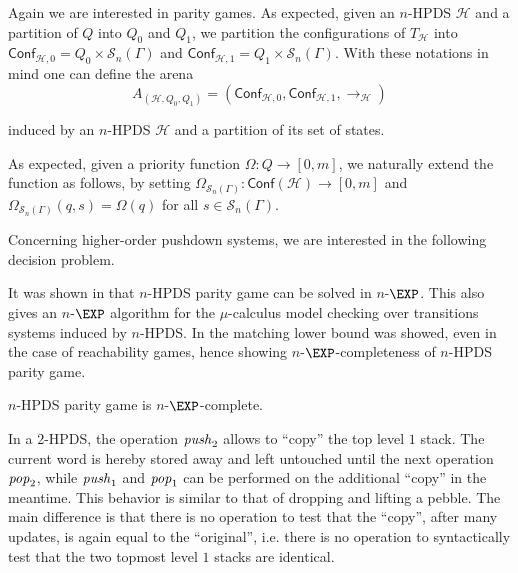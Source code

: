 \documentclass[a4paper,UKenglish,cleveref, autoref, thm-restate]{lipics-v2021}
\newcommand{\problemx}[3]{
	\vspace{0.2cm}
\par\noindent\underline{\sc#1}\par\nobreak\vskip.2\baselineskip
\begingroup\clubpenalty10000\widowpenalty10000
\setbox0\hbox{\bf INPUT:\ }\setbox1\hbox{\bf QUESTION:\ }
\dimen0=\wd0\ifnum\wd1>\dimen0\dimen0=\wd1\fi
\vskip-\parskip\noindent
\hbox to\dimen0{\box0\hfil}\hangindent\dimen0\hangafter1\ignorespaces#2\par
\vskip-\parskip\noindent
\hbox to\dimen0{\box1\hfil}\hangindent\dimen0\hangafter1\ignorespaces#3\par
\endgroup
	\vspace{-0.2cm}
}
\renewcommand{\H}{\mathcal{H}}
\newcommand{\Conf}{\mathsf{Conf}}
\newcommand{\win}{\textsc{Win}}
\begin{document}
Again we are interested in parity games.
As expected, given an 
 $n$-HPDS $\mathcal{H}$
 and a partition of
$Q$ into $Q_0$ and $Q_1$,
we partition the configurations of
$T_{\mathcal{H}}$
into
$\Conf_{\mathcal{H},0}=Q_0\times \mathscr{S}_n(\Gamma)$
and
$\Conf_{\mathcal{H},1}=Q_1\times\mathscr{S}_n(\Gamma)$.
%
%
With these notations in mind one can define the arena
$$
A_{(\mathcal{H}, Q_0, Q_1)}
=
(\Conf_{\mathcal{H},0}, \Conf_{\mathcal{H},1}, \rightarrow_{\mathcal{H}})$$
\par\noindent\ignorespacesafterend
induced by an $n$-HPDS $\mathcal{H}$ and a partition of its set of states.


As expected, given a 
priority function $\Omega: Q \to [0, m]$,
we naturally extend the function
as follows,
by setting
$\Omega_{\mathscr{S}_n(\Gamma)}: \Conf(\mathcal{H}) \to [0, m]$
and
$\Omega_{\mathscr{S}_n(\Gamma)}(q, s) = \Omega(q)$
for all
$s \in \mathscr{S}_n(\Gamma)$.





Concerning higher-order pushdown systems, we are interested in the following decision problem. 


It was shown in \cite{Cach03} that {\sc $n$-HPDS parity game} can
be solved in $n$-$\EXP$. This also gives an $n$-$\EXP$ algorithm for the $\mu$-calculus
model checking over transitions systems induced by  $n$-HPDS.
In \cite{cachat2007complexity} the matching lower bound was showed, even in the case of reachability games,
hence showing $n$-$\EXP$-completeness of {\sc $n$-HPDS parity game}.

\begin{theorem}{\cite{ Cach03, cachat2007complexity}}
{\sc $n$-HPDS parity game} is $n$-$\EXP$-complete.
\end{theorem}





In a $2$-HPDS, the operation $\text{\textit{push}}_2$ 
allows to ``copy'' the top level $1$ stack. The current word is hereby stored away and left untouched
until the next operation $\text{\textit{pop}}_2$,
while $\text{\textit{push}}_1$ and $\text{\textit{pop}}_1$ can be performed on the additional ``copy'' in the meantime. This behavior is similar to that of dropping and lifting a pebble. 
The main difference is that there is no operation to test that the ``copy'', after many updates, is again equal to the ``original'', i.e. there is no operation to syntactically test that the two topmost level $1$ stacks are identical.
\end{document}
